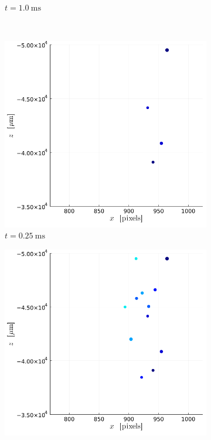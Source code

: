 \begin{figure}[H]
\begin{subfigure}[t]{0.32\linewidth}
        \caption*{$t = \SI{1.0}{\ms}$}
    \end{subfigure}
    \\
    \begin{subfigure}[t]{0.32\linewidth}
        \includegraphics[width=\linewidth]{./Figure/4_Results/exp/xz_detailed_view/out0002.png}
        \caption*{$t = \SI{0.25}{\ms}$}
    \end{subfigure}
    \begin{subfigure}[t]{0.32\linewidth}
        \includegraphics[width=\linewidth]{./Figure/4_Results/exp/xz_detailed_view/out0006.png}

\end{subfigure}
\end{figure}
